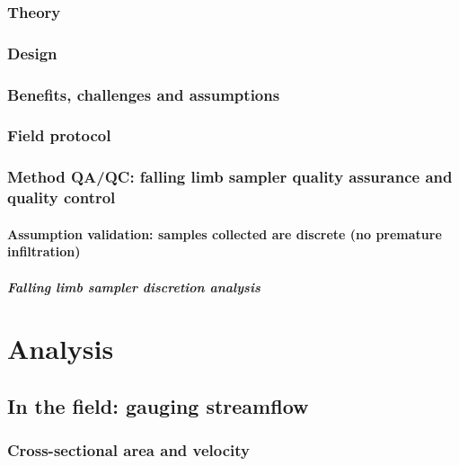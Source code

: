 \documentclass[]{article}
\let\oldparagraph\paragraph
\renewcommand{\paragraph}[1]{\oldparagraph{#1}\mbox{}}
\let\oldsubparagraph\subparagraph
\renewcommand{\subparagraph}[1]{\oldsubparagraph{#1}\mbox{}}
\begin{document}
\subsubsection{Theory}\label{theory-1}

\subsubsection{Design}\label{design-1}

\subsubsection{Benefits, challenges and
assumptions}\label{benefits-challenges-and-assumptions-1}

\subsubsection{Field protocol}\label{field-protocol-1}

\subsubsection{Method QA/QC: falling limb sampler quality assurance and
quality
control}\label{method-qaqc-falling-limb-sampler-quality-assurance-and-quality-control}

\paragraph{Assumption validation: samples collected are discrete (no
premature
infiltration)}\label{assumption-validation-samples-collected-are-discrete-no-premature-infiltration}

\subparagraph{Falling limb sampler discretion
analysis}\label{falling-limb-sampler-discretion-analysis}

\section{Analysis}\label{analysis}

\subsection{In the field: gauging
streamflow}\label{in-the-field-gauging-streamflow}

\subsubsection{Cross-sectional area and
velocity}\label{cross-sectional-area-and-velocity}
\end{document}
